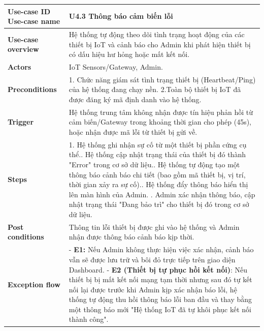 \vspace{0.5cm}
\noindent
\begin{tabularx}{\textwidth}{|>{\raggedright\arraybackslash}p{4cm}|X|}
\hline
\textbf{Use-case ID} \newline \textbf{Use-case name} & U4.3 \newline \textbf{Thông báo cảm biến lỗi} \\ \hline
\textbf{Use-case overview} & Hệ thống tự động theo dõi tình trạng hoạt động của các thiết bị IoT và cảnh báo cho Admin khi phát hiện thiết bị có dấu hiệu hư hỏng hoặc mất kết nối. \\ \hline
\textbf{Actors} & IoT Sensors/Gateway, Admin. \\ \hline
\textbf{Preconditions} & 
1. Chức năng giám sát tình trạng thiết bị (Heartbeat/Ping) của hệ thống đang chạy nền. \newline
2.Toàn bộ thiết bị IoT đã được đăng ký mã định danh vào hệ thống.\\ \hline
\textbf{Trigger} & Hệ thống trung tâm không nhận được tín hiệu phản hồi từ cảm biến/Gateway trong khoảng thời gian cho phép (45s), hoặc nhận được mã lỗi từ thiết bị gửi về. \\ \hline
\textbf{Steps} & 
1. Hệ thống ghi nhận sự cố từ một thiết bị phần cứng cụ thể.\newline
2. Hệ thống cập nhật trạng thái của thiết bị đó thành "Error" trong cơ sở dữ liệu.\newline
3. Hệ thống tự động tạo một thông báo cảnh báo chi tiết (bao gồm mã thiết bị, vị trí, thời gian xảy ra sự cố).\newline
4. Hệ thống đẩy thông báo hiển thị lên màn hình của Admin. \newline
5. Admin xác nhận thông báo, cập nhật trạng thái "Đang bảo trì" cho thiết bị đó trong cơ sở dữ liệu.\\ \hline
\textbf{Post conditions} & Thông tin lỗi thiết bị được ghi vào hệ thống và Admin nhận được thông báo cảnh báo kịp thời. \\ \hline
\textbf{Exception flow} & 
- \textbf{E1:} Nếu Admin không thực hiện việc xác nhận, cảnh báo vẫn sẽ được lưu trữ và bôi đỏ trực tiếp trên giao diện Dashboard. \newline
- \textbf{E2 (Thiết bị tự phục hồi kết nối)}: Nếu thiết bị bị mất kết nối mạng tạm thời nhưng sau đó tự kết nối lại được trước khi Admin kịp xác nhận báo lỗi, hệ thống tự động thu hồi thông báo lỗi ban đầu và thay bằng một thông báo mới "Hệ thống IoT đã tự khôi phục kết nối thành công". \\ \hline
\end{tabularx}
\newpage
